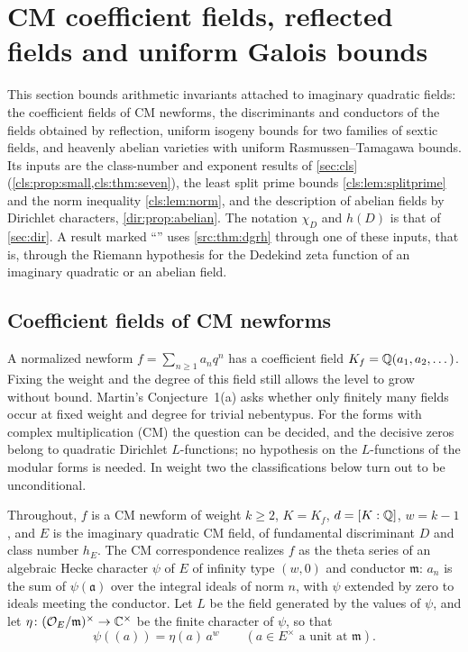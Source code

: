 \providecommand{\dirfiles}[1]{\par\smallskip\noindent
  {\footnotesize\raggedright\emph{Files:} #1.\par}\smallskip}
\providecommand{\dirP}{\mathbb{P}}
\providecommand{\dirE}{\mathbb{E}}
\providecommand{\dirU}{\mathrm{U}}
\section{CM coefficient fields, reflected fields and uniform Galois bounds}\label{sec:cmf}

This section bounds arithmetic invariants attached to imaginary quadratic fields: the
coefficient fields of CM newforms, the discriminants and conductors of the fields obtained
by reflection, uniform isogeny bounds for two families of sextic fields, and heavenly
abelian varieties with uniform Rasmussen--Tamagawa bounds. Its inputs are the
class-number and exponent results of \cref{sec:cls}
(\cref{cls:prop:small,cls:thm:seven}), the least split prime bounds
\cref{cls:lem:splitprime} and the norm inequality \cref{cls:lem:norm}, and the description
of abelian fields by Dirichlet characters, \cref{dir:prop:abelian}. The notation $\chi_D$
and $h(D)$ is that of \cref{sec:dir}. A result marked ``\stG'' uses \cref{src:thm:dgrh}
through one of these inputs, that is, through the Riemann hypothesis for the Dedekind zeta
function of an imaginary quadratic or an abelian field.

\subsection{Coefficient fields of CM newforms}\label{dir:sec:cm}

A normalized newform $f=\sum_{n\ge1}a_nq^n$ has a coefficient field
$K_f=\mathbb{Q}(a_1,a_2,\dots)$. Fixing the weight and the degree of this field still allows
the level to grow without bound. Martin's Conjecture~1(a)
\cite{Martin2025Rationality} asks whether only finitely many fields occur at fixed
weight and degree for trivial nebentypus. For the forms with complex multiplication
(CM) the question can be decided, and the decisive zeros belong to quadratic Dirichlet
$L$-functions; no hypothesis on the $L$-functions of the modular forms is needed. In
weight two the classifications below turn out to be unconditional.

Throughout, $f$ is a CM newform of weight $k\ge2$, $K=K_f$, $d=[K:\mathbb{Q}]$, $w=k-1$, and
$E$ is the imaginary quadratic CM field, of fundamental discriminant $D$ and class
number $h_E$. The CM correspondence realizes $f$ as the theta series of an algebraic
Hecke character $\psi$ of $E$ of infinity type $(w,0)$ and conductor $\mathfrak m$:
$a_n$ is the sum of $\psi(\mathfrak a)$ over the integral ideals of norm $n$, with
$\psi$ extended by zero to ideals meeting the conductor. Let $L$ be the field generated
by the values of $\psi$, and let $\eta\colon(\mathcal{O}_E/\mathfrak m)^\times\to\mathbb{C}^\times$ be
the finite character of $\psi$, so that
\begin{equation}\label{dir:eq:eta}
 \psi((a))=\eta(a)\,a^w\qquad(a\in E^\times\text{ a unit at }\mathfrak m).
\end{equation}

